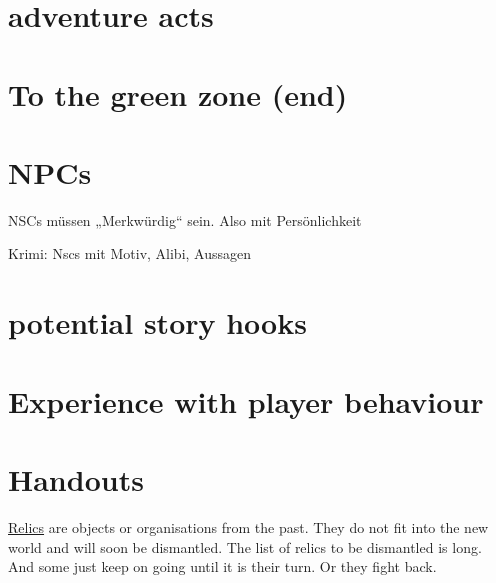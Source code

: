 \section{adventure acts}

\section{To the green zone (end)}

\section{NPCs}

NSCs müssen „Merkwürdig“ sein. Also mit Persönlichkeit

Krimi: Nscs mit Motiv, Alibi, Aussagen


\section{potential story hooks}

\section{Experience with player behaviour}

\section{Handouts}



\begin{sidebarBox}[title=Relics]
\hyperref[sec:Relic]{Relics} are objects or organisations from the past. They do not fit into the new world and will soon be dismantled. The list of relics to be dismantled is long. And some just keep on going until it is their turn. Or they fight back.
\end{sidebarBox}



